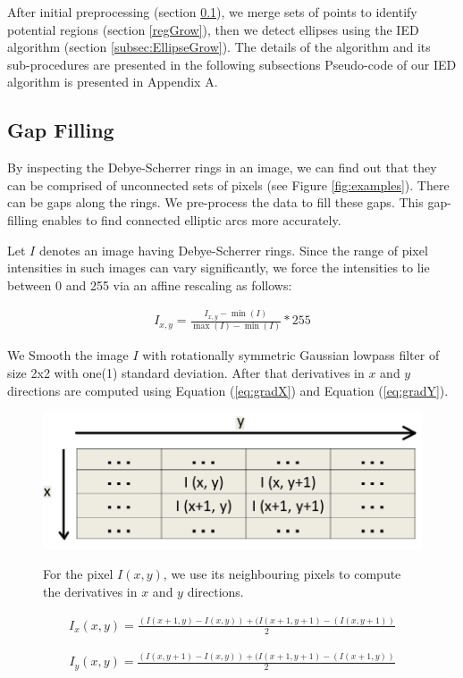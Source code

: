\documentclass[preprint]{iucr}              %
\newcommand\dsrs{Debye-Scherrer rings}
\begin{document}
After initial pre\-processing (section \ref{sec:gapFilling}), we merge sets of points to identify potential regions (section \ref{regGrow}), then we detect ellipses using the IED algorithm (section \ref{subsec:EllipseGrow}). The details of the algorithm and its sub-procedures are presented in the following subsections Pseudo-code of our IED algorithm is presented in Appendix A.

\subsection{Gap Filling} \label{sec:gapFilling}
By inspecting the \dsrs{} in an image, we can find out that they can be comprised of unconnected sets of pixels (see Figure \ref{fig:examples}). There can be gaps along the rings. We pre-process the data to fill these gaps. This gap-filling enables to find connected elliptic arcs more accurately.

Let $I$ denotes an image having {\dsrs}. Since the range of pixel intensities in such images can vary significantly, we force the intensities to lie between 0 and 255 via an affine rescaling as follows:

\begin{align} \label{eq:affine}    
    I_{x,y} = \frac{I_{x,y} - \min(I)}{\max(I) - \min(I)} * 255    
\end{align}

We Smooth the image $I$ with rotationally symmetric Gaussian lowpass filter of size 2x2 with one(1) standard deviation.
After that derivatives in $x$ and $y$ directions are computed using Equation (\ref{eq:gradX}) and Equation (\ref{eq:gradY}).

\begin{figure}
\includegraphics[width=.45\linewidth]{Figures/Gradiant_Pixels_grid.png}
\label{fig:grid}
\caption{For the pixel $I(x,y)$, we use its neighbouring pixels to compute the derivatives in $x$ and $y$ directions.}
\end{figure}


\begin{align} \label{eq:gradX}
I_{x}(x,y) = \frac{(I(x+1,y)-I(x,y)) + (I(x+1,y+1)-(I(x,y+1))}{2}
\end{align}

\begin{align} \label{eq:gradY}
I_{y}(x,y) = \frac{(I(x,y+1)-I(x,y)) + (I(x+1,y+1)-(I(x+1,y))}{2}
\end{align}
\end{document}
